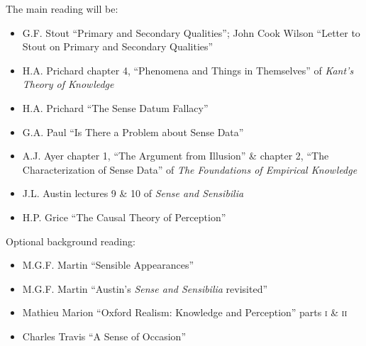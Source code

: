 \documentclass[11pt]{article}
\begin{document}
\noindent The main reading will be:
\begin{itemize}
	\item G.F. Stout ``Primary and Secondary Qualities''; John Cook Wilson ``Letter to Stout on Primary and Secondary Qualities''
	\item H.A. Prichard chapter 4, ``Phenomena and Things in Themselves'' of \emph{Kant's Theory of Knowledge}
	\item H.A. Prichard ``The Sense Datum Fallacy''
	\item G.A. Paul ``Is There a Problem about Sense Data''
	\item A.J. Ayer chapter 1, ``The Argument from Illusion'' \& chapter 2, ``The Characterization of Sense Data'' of \emph{The Foundations of Empirical Knowledge}
	\item J.L. Austin lectures 9 \& 10 of \emph{Sense and Sensibilia}
	\item H.P. Grice ``The Causal Theory of Perception''
\end{itemize}

\noindent Optional background reading:
\begin{itemize}
	\item M.G.F. Martin ``Sensible Appearances''
	\item M.G.F. Martin ``Austin's \emph{Sense and Sensibilia} revisited''
	\item Mathieu Marion ``Oxford Realism: Knowledge and Perception'' parts \textsc{i} \& \textsc{ii}
	\item Charles Travis ``A Sense of Occasion''
\end{itemize}

\end{document}
